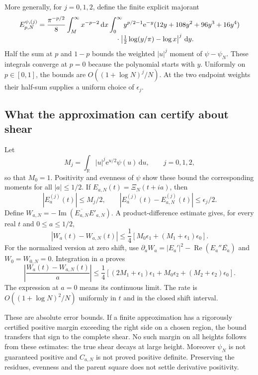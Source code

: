 \documentclass[11pt,letterpaper]{article}
\numberwithin{equation}{section}
\theoremstyle{remark}\newtheorem{remark}[theorem]{Remark}
\newcommand{\R}{\mathbb R}
\newcommand{\dd}{\,\mathrm d}
\newcommand{\ee}{\mathrm e}
\newcommand{\Repart}{\operatorname{Re}}
\newcommand{\Impart}{\operatorname{Im}}
\begin{document}
More generally, for $j=0,1,2$, define the finite explicit majorant
\begin{align}\label{eq:logMoments}
E^{\psi,(j)}_{p,N}
={}&\frac{\pi^{-p/2}}8\int_M^\infty x^{-p-2}\dd x
\int_0^\infty y^{p/2-1}\ee^{-y}
(12y+108y^2+96y^3+16y^4)\notag\\[-1mm]
&\hspace{35mm}\cdot\left|\tfrac12\log(y/\pi)-\log x\right|^j\dd y.
\end{align}
Half the sum at $p$ and $1-p$ bounds the weighted $|u|^j$ moment of $\psi-\psi_N$. These integrals converge at $p=0$ because the polynomial starts with $y$. Uniformly on $p\in[0,1]$, the bounds are $O((1+\log N)^j/N)$. At the two endpoint weights their half-sum supplies a uniform choice of $\epsilon_j$.

\subsection{What the approximation can certify about shear}
Let
\[
M_j=\int_{\R}|u|^j\ee^{u/2}\psi(u)\dd u,
\qquad j=0,1,2,
\]
so that $M_0=1$. Positivity and evenness of $\psi$ show these bound the corresponding moments for all $|a|\le1/2$. If $E_{a,N}(t)=\Xi_N(t+ia)$, then
\[
|E_a^{(j)}(t)|\le M_j/2,
\qquad |E_a^{(j)}(t)-E_{a,N}^{(j)}(t)|\le\epsilon_j/2.
\]
Define $W_{a,N}=-\Impart(\overline{E_{a,N}}E'_{a,N})$. A product-difference estimate gives, for every real $t$ and $0\le a\le1/2$,
\begin{equation}\label{eq:absoluteShear}
|W_a(t)-W_{a,N}(t)|
\le\frac14\left[M_0\epsilon_1+(M_1+\epsilon_1)\epsilon_0\right].
\end{equation}
For the normalized version at zero shift, use
$\partial_aW_a=|E_a'|^2-\Repart(E_a''\overline{E_a})$
and $W_0=W_{0,N}=0$. Integration in $a$ proves
\begin{equation}\label{eq:normalizedShear}
\boxed{\left|\frac{W_a(t)-W_{a,N}(t)}a\right|
\le\frac14\left[(2M_1+\epsilon_1)\epsilon_1
+M_0\epsilon_2+(M_2+\epsilon_2)\epsilon_0\right].}
\end{equation}
The expression at $a=0$ means its continuous limit. The rate is $O((1+\log N)^2/N)$ uniformly in $t$ and in the closed shift interval.

These are absolute error bounds. If a finite approximation has a rigorously certified positive margin exceeding the right side on a chosen region, the bound transfers that sign to the complete shear. No such margin on all heights follows from these estimates: the true shear decays at large height. Moreover $\psi_N$ is not guaranteed positive and $C_{a,N}$ is not proved positive definite. Preserving the residues, evenness and the parent square does not settle derivative positivity.
\end{document}
